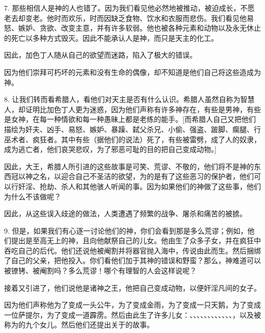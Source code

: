 7. 那些相信人是神的人也错了。因为我们看见他必然地被推动，被迫成长，不愿老去却变老。他时而欢乐，时而因缺乏食物、饮水和衣服而悲伤。我们看见他易怒、嫉妒、贪欲、改变主意，并有许多软弱。他也被各种元素和动物以及永无休止的死亡以多种方式毁灭。因此不能承认人是神，而只是天主的化工。\par

因此，加色丁人随从自己的欲望而迷路，陷入了极大的错误。\par

因为他们崇拜可朽坏的元素和没有生命的偶像，却不知道是他们自己将这些造成为神。\par

8. 让我们转而看希腊人，看他们对天主是否有什么认识。希腊人虽然自称为智慧人，却证明比加色丁人更为迷惑，因为他们声称有许多神存在，有些是男神，有些是女神，在每一种情欲和每一种愚昧上都是老练的能手。[而希腊人自己又把他们描绘为奸夫、凶手、易怒、嫉妒、暴躁、弑父杀兄、小偷、强盗、跛脚、瘸腿、行巫术者、疯狂者。其中有些（据他们的说法）死了，有些被雷劈，成了人的奴隶，成为逃亡者，他们哀哭悲叹，为了邪恶可耻的目的把自己变成动物。]\par

因此，大王，希腊人所引进的这些故事是可笑、荒谬、不敬的，他们将不是神的东西冠以神之名，以迎合自己不圣洁的欲望，为的是有了这些恶习的保护者，他们可以行奸淫、抢劫、杀人和其他骇人听闻的事。因为如果他们的神做了这些事，他们为什么不该做呢？\par

因此，从这些误入歧途的做法，人类遭遇了频繁的战争、屠杀和痛苦的被掳。\par

9. 但是，如果我们有心逐一讨论他们的神，你们会看到那是多么荒谬；例如，他们提出是至高无上的神，且向他献祭自己的儿女。他由生了众多子女，并在疯狂中吞吃自己的后代。他们还说他被阉割并将器官抛入海中，传说由此而生。然后捆绑了自己的父亲，把他投入。你们看他们加于其神的错误和野蛮？那么，神难道可以被镣铐、被阉割吗？多么荒谬！哪个有理智的人会这样说呢？\par

接着又引进了，他们说他是诸神之王，他把自己变成动物，以便奸淫凡间的女子。\par

因为他们声称他为了变成一头公牛，为了变成金雨，为了变成一只天鹅，为了变成一位萨提尔，为了变成一道霹雳。然后由此生了许多儿女：、、、、、、、、、、、、，以及被称为的九个女儿。然后他们还提出关于的故事。\par

